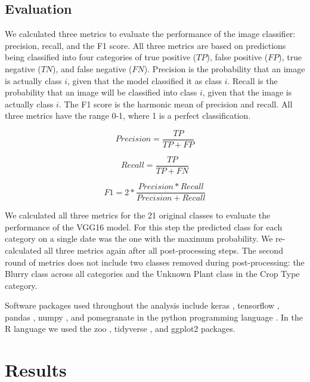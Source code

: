 \documentclass{article}
\begin{document}
\subsection{Evaluation}

We calculated three metrics to evaluate the performance of the image classifier: precision, recall, and the F1 score. All three metrics are based on predictions being classified into four categories of true positive ($TP$), false positive ($FP$), true negative ($TN$), and false negative ($FN$). Precision is the probability that an image is actually class $i$, given that the model classified it as class $i$. Recall is the probability that an image will be classified into class $i$, given that the image is actually class $i$. The F1 score is the harmonic mean of precision and recall. All three metrics have the range 0-1, where 1 is a perfect classification. 

\begin{equation}
Precision = \frac{TP}{TP+FP}
\end{equation}

\begin{equation}
Recall = \frac{TP}{TP+FN}
\end{equation}

\begin{equation}
F1 = 2*\frac{Precision*Recall}{Precision+Recall}
\end{equation}

We calculated all three metrics for the 21 original classes to evaluate the performance of the VGG16 model. For this step the predicted class for each category on a single date was the one with the maximum probability. We re-calculated all three metrics again after all post-processing steps. The second round of metrics does not include two classes removed during post-processing: the Blurry class across all categories and the Unknown Plant class in the Crop Type category. 

Software packages used throughout the analysis include keras \citep{chollet2018-keras}, tensorflow \citep{abadi2015-tensorflow}, pandas \citep{mckinney2010-pandas}, numpy \citep{harris2020-numpy}, and pomegranate \citep{schreiber2018-pomegranate} in the python programming language \citep{python2003}. In the R language \citep{rcitation} we used the zoo \citep{zeileis2005-zoo}, tidyverse \citep{wickham2019-tidyverse}, and ggplot2 \citep{wickham2016-ggplot2} packages. 


\section{Results}
\end{document}
